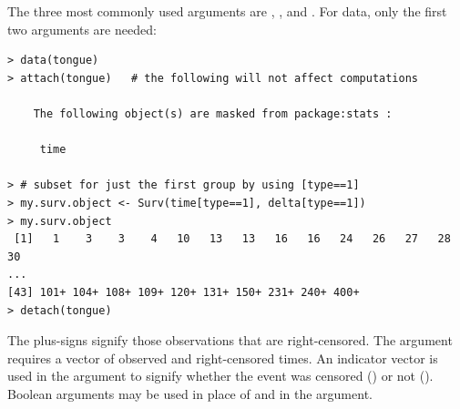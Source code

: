 \documentclass[11pt]{article}
\begin{document}
The three most commonly used  arguments are , , and . For  data, only the first two arguments are needed:
\begin{verbatim}
> data(tongue)
> attach(tongue)   # the following will not affect computations

	The following object(s) are masked from package:stats :

	 time 

> # subset for just the first group by using [type==1]
> my.surv.object <- Surv(time[type==1], delta[type==1])
> my.surv.object
 [1]   1    3    3    4   10   13   13   16   16   24   26   27   28   30 
...
[43] 101+ 104+ 108+ 109+ 120+ 131+ 150+ 231+ 240+ 400+
> detach(tongue)
\end{verbatim}
The plus-signs signify those observations that are right-censored. The  argument requires a vector of observed and right-censored times. An indicator vector is used in the  argument to signify whether the event was censored () or not (). Boolean arguments may be used in place of  and  in the  argument.



%
%
%
\end{document}
